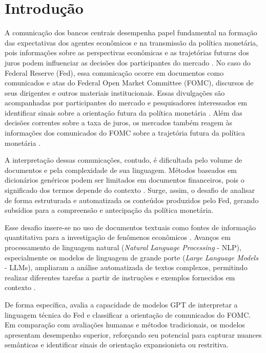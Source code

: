 \chapter{Introdução}

A comunicação dos bancos centrais desempenha papel fundamental na formação das
expectativas dos agentes econômicos e na transmissão da política monetária, pois
informações sobre as perspectivas econômicas e as trajetórias futuras dos juros
podem influenciar as decisões dos participantes do mercado \citep{woodford2005central}.
No caso do Federal Reserve (Fed), essa comunicação ocorre em documentos como
comunicados e atas do Federal Open Market Committee (FOMC), discursos de seus
dirigentes e outros materiais institucionais. Essas divulgações são acompanhadas
por participantes do mercado e pesquisadores interessados em identificar sinais
sobre a orientação futura da política monetária \citep{blinder2008central}.
Além das decisões correntes sobre a taxa de juros, os mercados também reagem às
informações dos comunicados do FOMC sobre a trajetória futura da política monetária
\citep{gurkaynak2005actions}.

A interpretação dessas comunicações, contudo, é dificultada pelo volume de
documentos e pela complexidade de sua linguagem. Métodos baseados em dicionários
genéricos podem ser limitados em documentos financeiros, pois o significado dos
termos depende do contexto \citep{loughran2011liability}. Surge, assim, o desafio
de analisar de forma estruturada e automatizada os conteúdos produzidos pelo Fed,
gerando subsídios para a compreensão e antecipação da política monetária.

Esse desafio insere-se no uso de documentos textuais como fontes de informação
quantitativa para a investigação de fenômenos econômicos \citep{gentzkow2019text}.
Avanços em processamento de linguagem natural (\textit{Natural Language Processing}
- NLP), especialmente os modelos de linguagem de grande porte (\textit{Large
Language Models} - LLMs), ampliaram a análise automatizada de textos complexos,
permitindo realizar diferentes tarefas a partir de instruções e exemplos fornecidos
em contexto \citep{brown2020language}.

De forma específica, \cite{hansen2024can} avalia a capacidade de modelos GPT de
interpretar a linguagem técnica do Fed e classificar a orientação de comunicados
do FOMC. Em comparação com avaliações humanas e métodos tradicionais, os modelos
apresentam desempenho superior, reforçando seu potencial para capturar nuances
semânticas e identificar sinais de orientação expansionista ou restritiva.

